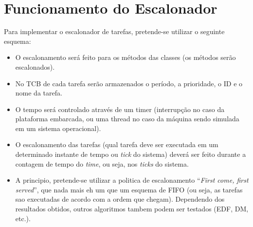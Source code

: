 %
%
%
%
%

%
%
%
%
%

\section{Funcionamento do Escalonador} \label{sec:scheduler}

Para implementar o escalonador de tarefas, pretende-se utilizar o seguinte esquema:

\begin{itemize}
    \item O escalonamento será feito para os métodos das classes (os métodos serão escalonados).
    \item No TCB de cada tarefa serão armazenados o período, a prioridade, o ID e o nome da tarefa.
    \item O tempo será controlado através de um timer (interrupção no caso da plataforma embarcada, ou uma thread no caso da máquina sendo simulada em um sistema operacional).
    \item O escalonamento das tarefas (qual tarefa deve ser executada em um determinado instante de tempo ou \textit{tick} do sistema) deverá ser feito durante a contagem de tempo do \textit{time}, ou seja, nos \textit{ticks} do sistema.
    \item A principio, pretende-se utilizar a politica de escalonamento ``\textit{First come, first served}'', que nada mais eh um que um esquema de FIFO (ou seja, as tarefas sao executadas de acordo com a ordem que chegam). Dependendo dos resultados obtidos, outros algoritmos tambem podem ser testados (EDF, DM, etc.).
\end{itemize}
